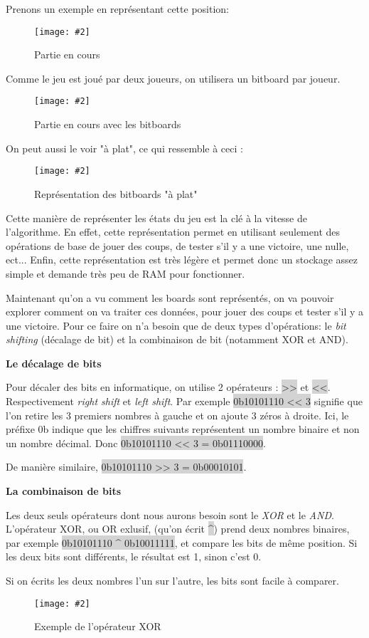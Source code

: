 \documentclass[a4paper]{article}
\newcommand{\img}[3][]{
    \begin{figure}[H]
        \centering
        \texttt{[image: \#2]}
        \caption{#1}    
    \end{figure}
}
\newcommand{\inlinecode}[1]{\colorbox{lightgray}{#1}}
\newcommand{\ptitle}[1]{\vspace{10pt}
{\large \textbf{#1}}}
\begin{document}
    Prenons un exemple en représentant cette position:
    \img[Partie en cours]{Images/ExempleBitBoardsPt1.png}{0.3}

    Comme le jeu est joué par deux joueurs, on utilisera un bitboard par joueur.
    \img[Partie en cours avec les bitboards]{Images/ExempleBitBoardsPt2.png}{1}
    On peut aussi le voir "à plat", ce qui ressemble à ceci :
    \img[Représentation des bitboards "à plat"]{Images/FlatBiboard.png}{1}

    Cette manière de représenter les états du jeu est la clé à la vitesse de l'algorithme. En effet, cette représentation permet en utilisant seulement des opérations de base de jouer des coups, de tester s'il y a une victoire, une nulle, ect... Enfin, cette représentation est très légère et permet donc un stockage assez simple et demande très peu de RAM pour fonctionner.

    Maintenant qu'on a vu comment les boards sont représentés, on va pouvoir explorer comment on va traiter ces données, pour jouer des coups et tester s'il y a une victoire. Pour ce faire on n'a besoin que de deux types d'opérations: le \textit{bit shifting} (décalage de bit) et la combinaison de bit (notamment XOR et AND).

    \ptitle{Le décalage de bits}

    Pour décaler des bits en informatique, on utilise 2 opérateurs : \inlinecode{>>} et \inlinecode{<<}. Respectivement \textit{right shift} et \textit{left shift}. Par exemple \inlinecode{0b10101110 << 3} signifie que l'on retire les 3 premiers nombres à gauche et on ajoute 3 zéros à droite. Ici, le préfixe 0b indique que les chiffres suivants représentent un nombre binaire et non un nombre décimal. Donc \inlinecode{0b10101110 << 3 = 0b01110000}.
   
    De manière similaire, \inlinecode{0b10101110 >> 3 = 0b00010101}.

    
    \ptitle{La combinaison de bits}

    Les deux seuls opérateurs dont nous aurons besoin sont le \textit{XOR} et le \textit{AND}. L'opérateur XOR, ou OR exlusif, (qu'on écrit \inlinecode{\^{}}) prend deux nombres binaires, par exemple \inlinecode{0b10101110 \^{} 0b10011111}, et compare les bits de même position. Si les deux bits sont différents, le résultat est 1, sinon c'est 0.

    Si on écrits les deux nombres l'un sur l'autre, les bits sont facile à comparer.
    \img[Exemple de l'opérateur XOR]{Images/XORExemple.png}{0.15}
\end{document}
